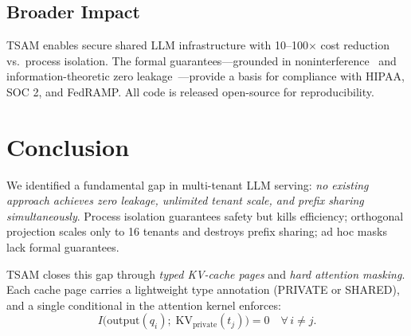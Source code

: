 \documentclass[11pt]{article}
\begin{document}
\subsection{Broader Impact}

TSAM enables secure shared LLM infrastructure with 10--100$\times$ cost reduction vs.\ process isolation. The formal guarantees---grounded in noninterference~\citep{goguen1982security} and information-theoretic zero leakage~\citep{shannon1948mathematical}---provide a basis for compliance with HIPAA, SOC 2, and FedRAMP. All code is released open-source for reproducibility.

\section{Conclusion}
\label{sec:conclusion}

We identified a fundamental gap in multi-tenant LLM serving: \emph{no existing approach achieves zero leakage, unlimited tenant scale, and prefix sharing simultaneously}. Process isolation guarantees safety but kills efficiency; orthogonal projection scales only to 16 tenants and destroys prefix sharing; ad hoc masks lack formal guarantees.

TSAM closes this gap through \emph{typed KV-cache pages} and \emph{hard attention masking}. Each cache page carries a lightweight type annotation (PRIVATE or SHARED), and a single conditional in the attention kernel enforces:
\begin{equation}
    I\!\bigl(\mathrm{output}(q_i);\;\mathrm{KV}_{\mathrm{private}}(t_j)\bigr) = 0 \quad \forall\, i \neq j.
\end{equation}
\end{document}
